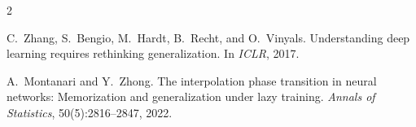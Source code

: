 \documentclass[11pt]{article}
\begin{document}

\begin{thebibliography}{2}

C.~Zhang, S.~Bengio, M.~Hardt, B.~Recht, and O.~Vinyals.
\newblock Understanding deep learning requires rethinking generalization.
\newblock In \emph{ICLR}, 2017.

A.~Montanari and Y.~Zhong.
\newblock The interpolation phase transition in neural networks: Memorization and generalization under lazy training.
\newblock \emph{Annals of Statistics}, 50(5):2816--2847, 2022.

\end{thebibliography}
\end{document}
